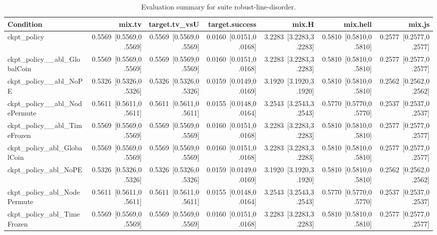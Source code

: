 \begin{table}[t]
\centering
\caption{Evaluation summary for suite robust-line-disorder.}
\label{tab:eval_robust-line-disorder}
\begin{tabular}{lrrrrrr}
\toprule
Condition & mix.tv & target.tv\_vsU & target.success & mix.H & mix.hell & mix.js \\
\midrule
ckpt\_policy & 0.5569~[0.5569,0.5569] & 0.5569~[0.5569,0.5569] & 0.0160~[0.0151,0.0168] & 3.2283~[3.2283,3.2283] & 0.5810~[0.5810,0.5810] & 0.2577~[0.2577,0.2577] \\
ckpt\_policy\_\_abl\_GlobalCoin & 0.5569~[0.5569,0.5569] & 0.5569~[0.5569,0.5569] & 0.0160~[0.0151,0.0168] & 3.2283~[3.2283,3.2283] & 0.5810~[0.5810,0.5810] & 0.2577~[0.2577,0.2577] \\
ckpt\_policy\_\_abl\_NoPE & 0.5326~[0.5326,0.5326] & 0.5326~[0.5326,0.5326] & 0.0159~[0.0149,0.0169] & 3.1920~[3.1920,3.1920] & 0.5810~[0.5810,0.5810] & 0.2562~[0.2562,0.2562] \\
ckpt\_policy\_\_abl\_NodePermute & 0.5611~[0.5611,0.5611] & 0.5611~[0.5611,0.5611] & 0.0155~[0.0148,0.0164] & 3.2543~[3.2543,3.2543] & 0.5770~[0.5770,0.5770] & 0.2537~[0.2537,0.2537] \\
ckpt\_policy\_\_abl\_TimeFrozen & 0.5569~[0.5569,0.5569] & 0.5569~[0.5569,0.5569] & 0.0160~[0.0151,0.0168] & 3.2283~[3.2283,3.2283] & 0.5810~[0.5810,0.5810] & 0.2577~[0.2577,0.2577] \\
ckpt\_policy\_abl\_GlobalCoin & 0.5569~[0.5569,0.5569] & 0.5569~[0.5569,0.5569] & 0.0160~[0.0151,0.0168] & 3.2283~[3.2283,3.2283] & 0.5810~[0.5810,0.5810] & 0.2577~[0.2577,0.2577] \\
ckpt\_policy\_abl\_NoPE & 0.5326~[0.5326,0.5326] & 0.5326~[0.5326,0.5326] & 0.0159~[0.0149,0.0169] & 3.1920~[3.1920,3.1920] & 0.5810~[0.5810,0.5810] & 0.2562~[0.2562,0.2562] \\
ckpt\_policy\_abl\_NodePermute & 0.5611~[0.5611,0.5611] & 0.5611~[0.5611,0.5611] & 0.0155~[0.0148,0.0164] & 3.2543~[3.2543,3.2543] & 0.5770~[0.5770,0.5770] & 0.2537~[0.2537,0.2537] \\
ckpt\_policy\_abl\_TimeFrozen & 0.5569~[0.5569,0.5569] & 0.5569~[0.5569,0.5569] & 0.0160~[0.0151,0.0168] & 3.2283~[3.2283,3.2283] & 0.5810~[0.5810,0.5810] & 0.2577~[0.2577,0.2577] \\
\bottomrule
\end{tabular}
\end{table}
